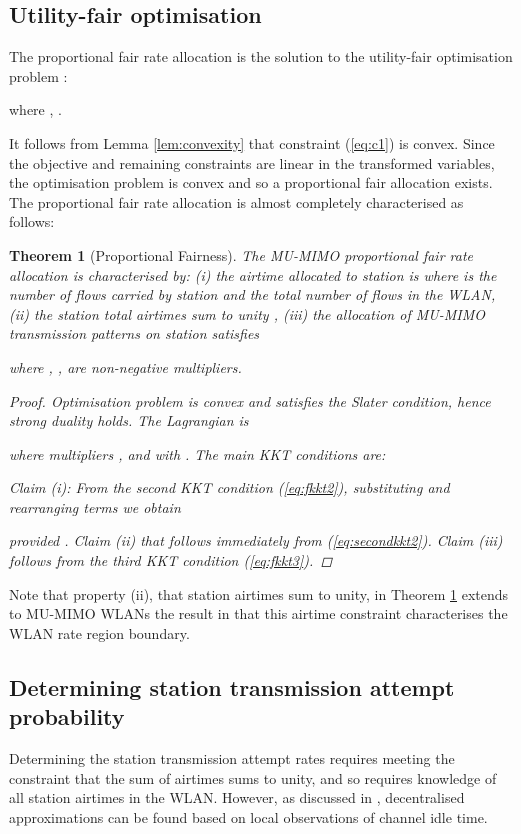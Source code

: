 \documentclass[11pt]{amsart}
\newtheorem{theorem}{Theorem}
\begin{document}
\subsection{Utility-fair optimisation}
The proportional fair rate allocation is the solution to the utility-fair optimisation problem :

where , .    


It follows from Lemma \ref{lem:convexity} that constraint (\ref{eq:c1}) is convex.   Since the objective and remaining constraints are linear in the transformed variables, the optimisation problem is convex and so a proportional fair allocation exists.    The proportional fair rate allocation is almost completely characterised as follows: 
\begin{theorem}[Proportional Fairness]\label{lem:kkt}
The MU-MIMO proportional fair rate allocation is characterised by: (i) the airtime allocated to station  is  where  is the number of flows carried by station  and  the total number of flows in the WLAN, (ii)  the station total airtimes sum to unity , (iii) the allocation of MU-MIMO transmission patterns on station  satisfies 

where ,  ,  are non-negative multipliers.
\begin{proof}
Optimisation problem  is convex and satisfies the Slater condition, hence strong duality holds. The Lagrangian is 
\small

\normalsize
where multipliers ,  and  with .  
The main KKT conditions are: 
\small

\normalsize
Claim (i): From the second KKT condition (\ref{eq:fkkt2}), substituting  and rearranging terms we obtain

provided .  Claim (ii) that  follows  immediately from (\ref{eq:secondkkt2}).   Claim (iii) follows from the third KKT condition (\ref{eq:fkkt3}).   
\end{proof}
\end{theorem}

Note that property (ii), that station airtimes sum to unity,  in Theorem \ref{lem:kkt} extends to MU-MIMO WLANs the result in \cite{DBLP:journals/corr/abs-1206-3120} that this airtime constraint characterises the WLAN rate region boundary.

\subsection{Determining station transmission attempt probability}
Determining the station transmission attempt rates  requires meeting the constraint that the sum of airtimes sums to unity, and so requires knowledge of all station airtimes in the WLAN.  However, as discussed in \cite{5910091}, decentralised approximations can be found based on local observations of channel idle time.
\end{document}
